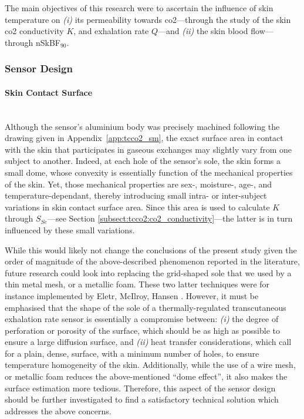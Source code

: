 The main objectives of this research were to ascertain the influence of skin temperature on \textit{(i)} its permeability towards \gls{co2}---through the study of the skin \gls{co2} conductivity $K$, and exhalation rate $Q$---and \textit{(ii)} the skin blood flow---through nSkBF$_{90}$.

\subsubsection{Sensor Design}

\paragraph{Skin Contact Surface}\label{subsect:tcco2:skin_surface}\makebox{}\\

Although the sensor's aluminium body was precisely machined following the drawing given in Appendix~\ref{app:tcco2_sm}, the exact surface area in contact with the skin that participates in gaseous exchanges may slightly vary from one subject to another. Indeed, at each hole of the sensor's sole, the skin forms a small dome, whose convexity is essentially function of the mechanical properties of the skin. Yet, those mechanical properties are sex-, moisture-, age-, and temperature-dependant\cite{salter1993, held2018}, thereby introducing small intra- or inter-subject variations in skin contact surface area. Since this area is used to calculate $K$ through $S_{Se}$---see Section \ref{subsect:tcco2:co2_conductivity}---the latter is in turn influenced by these small variations.

While this would likely not change the conclusions of the present study given the order of magnitude of the above-described phenomenon reported in the literature, \mfrin{}future research could look into replacing the grid-shaped sole that we used by a thin metal mesh, or a metallic foam. These two latter techniques were for instance implemented by Eletr, McIlroy, Hansen \etal{}\cite{eletr1978, mcilroy1978, hansen1980}. However, it must be emphasised that the shape of the sole of a thermally-regulated transcutaneous exhalation rate sensor is essentially a compromise between: \emph{(i)} the degree of perforation or porosity of the surface, which should be as high as possible to ensure a large diffusion surface, and \emph{(ii)} heat transfer considerations, which call for a plain, dense, surface, with a minimum number of holes, to ensure temperature homogeneity of the skin. Additionally, while the use of a wire mesh, or metallic foam reduces the above-mentioned \enquote{dome effect}, it also makes the surface estimation more tedious. Therefore, this aspect of the sensor design should be further investigated to find a satisfactory technical solution which addresses the above concerns.

